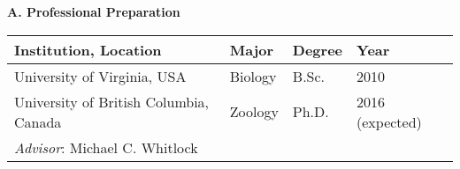 \renewcommand{\thepage}{Biographical Sketch  - Page \arabic{page} of 2}

\begin{comment}
Biographical Sketch [2 page limit]. Submit your CV in the section Biographical Sketches. Follow the
form in the Grants Program Guide II.C.2.f.i for senior personnel. List conference abstracts and titles of
presentations separately from peer--?reviewed articles. For unpublished manuscripts, list only those
submitted or accepted for publication (along with most likely date of publication).
\end{comment}





\setcounter{page}{1}
\renewcommand{\thepage}{Biographical Sketch - Page \arabic{page} of 2}


\textbf{A.  Professional Preparation}

\begin{tabular}{llll}
Institution, Location \hspace{0.5in} & Major \hspace{1in} & Degree  \hspace{0.25in} & Year \\
\hline
University of Virginia, USA  & Biology  & B.Sc.   & 2010 \\
University of British Columbia, Canada                     & Zoology              & Ph.D.                  & 2016 (expected) \\
\hspace{1cm} \emph{Advisor}: Michael C. Whitlock
\end{tabular}


